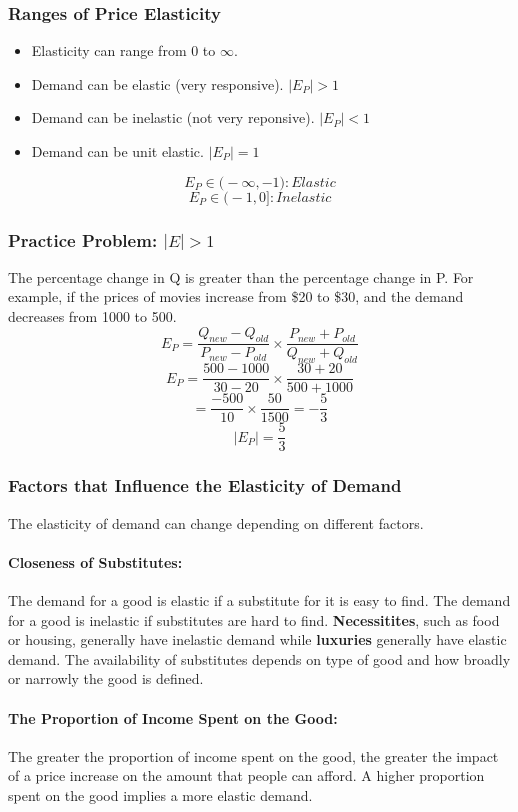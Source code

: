 \documentclass[letterpaper, 12pt]{article}
\begin{document}
\subsubsection{Ranges of Price Elasticity}
\begin{itemize}
  \item Elasticity can range from \( 0 \) to \( \infty \).
  \item Demand can be elastic (very responsive). \( |E_{P}| > 1 \)
  \item Demand can be inelastic (not very reponsive). \( |E_{P}| < 1 \)
  \item Demand can be unit elastic. \( |E_{P}| = 1 \)
\end{itemize}
\[ E_{P} \in \bigg(-\infty, -1\bigg): Elastic \]
\[ E_{P} \in \bigg(-1, 0\bigg]: Inelastic \]

\subsubsection{Practice Problem: \(|E| > 1 \)}
The percentage change in Q is greater than the percentage change in P.
For example, if the prices of movies increase from \$20 to \$30, and the demand
decreases from 1000 to 500.
\[ E_{P} = \frac{Q_{new}-Q_{old}}{P_{new}-P_{old}}\times
       \frac{P_{new}+P_{old}}{Q_{new}+Q_{old}} \]
\[ E_{P} = \frac{500-1000}{30-20}\times\frac{30+20}{500+1000} \]
\[ = \frac{-500}{10}\times\frac{50}{1500} = -\frac{5}{3} \]
\[ |E_{P}| = \frac{5}{3} \]

\subsubsection{Factors that Influence the Elasticity of Demand}
The elasticity of demand can change depending on different factors.

\paragraph{Closeness of Substitutes:} The demand for a good is elastic if a
substitute for it is easy to find. The demand for a good is inelastic if
substitutes are hard to find. \textbf{Necessitites}, such as food or housing,
generally have inelastic demand while \textbf{luxuries} generally have elastic
demand. The availability of substitutes depends on type of good and how
broadly or narrowly the good is defined.

\paragraph{The Proportion of Income Spent on the Good:}
The greater the proportion of income spent on the good, the greater the impact
of a price increase on the amount that people can afford. A higher proportion
spent on the good implies a more elastic demand.
\end{document}
